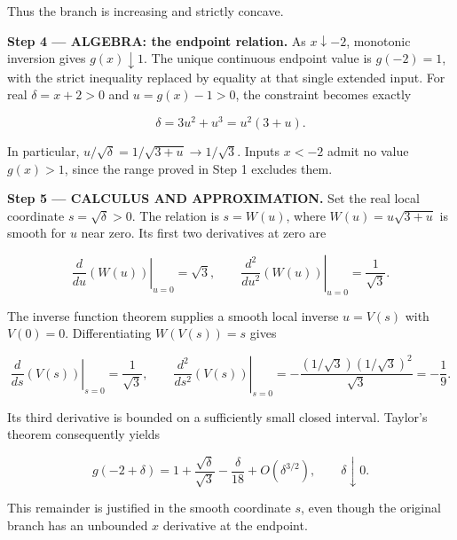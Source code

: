 \documentclass[11pt,oneside,openany]{book}
\begin{document}
Thus the branch is increasing and strictly concave.

\begingroup\color{AlgebraBlue}
\textbf{Step 4 --- ALGEBRA: the endpoint relation.} As \(x\downarrow-2\), monotonic inversion gives \(g(x)\downarrow1\). The unique continuous endpoint value is \(g(-2)=1\), with the strict inequality replaced by equality at that single extended input. For real \(\delta=x+2>0\) and \(u=g(x)-1>0\), the constraint becomes exactly

\[
\delta=3u^2+u^3=u^2(3+u).
\]

In particular, \(u/\sqrt\delta=1/\sqrt{3+u}\to1/\sqrt3\). Inputs \(x<-2\) admit no value \(g(x)>1\), since the range proved in Step 1 excludes them.

\endgroup
\textbf{Step 5 --- CALCULUS AND APPROXIMATION.} Set the real local coordinate \(s=\sqrt\delta>0\). The relation is \(s=W(u)\), where \(W(u)=u\sqrt{3+u}\) is smooth for \(u\) near zero. Its first two derivatives at zero are

\[
\left.\frac{d}{du}\left(W(u)\right)\right|_{u=0}=\sqrt3,
\qquad
\left.\frac{d^2}{du^2}\left(W(u)\right)\right|_{u=0}=\frac1{\sqrt3}.
\]

The inverse function theorem supplies a smooth local inverse \(u=V(s)\) with \(V(0)=0\). Differentiating \(W(V(s))=s\) gives

\[
\left.\frac{d}{ds}\left(V(s)\right)\right|_{s=0}=\frac1{\sqrt3},
\qquad
\left.\frac{d^2}{ds^2}\left(V(s)\right)\right|_{s=0}
=-\frac{(1/\sqrt3)(1/\sqrt3)^2}{\sqrt3}=-\frac19.
\]

Its third derivative is bounded on a sufficiently small closed interval. Taylor's theorem consequently yields

\[
g(-2+\delta)=1+\frac{\sqrt\delta}{\sqrt3}-\frac{\delta}{18}
+O(\delta^{3/2}),\qquad \delta\downarrow0.
\]

This remainder is justified in the smooth coordinate \(s\), even though the original branch has an unbounded \(x\) derivative at the endpoint.
\end{document}
